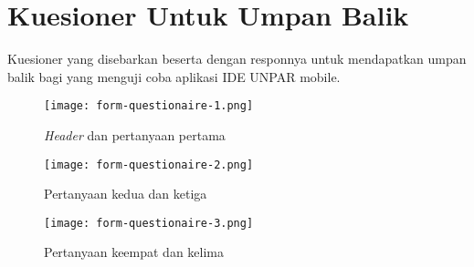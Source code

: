 \chapter{Kuesioner Untuk Umpan Balik}
\label{lamp:A}

\def\scl{1}
\def\leg{} 
\def\std{none}
\def\ymin{}
\def\ymax{}

Kuesioner yang disebarkan beserta dengan responnya untuk mendapatkan umpan balik bagi yang menguji coba aplikasi IDE UNPAR mobile.

\begin{figure}[H] 
	\centering  
	\centering
	\texttt{[image: form-questionaire-1.png]}
	\caption{\textit{Header} dan pertanyaan pertama}
	\label{fig:questionaire} 
\end{figure} 

\begin{figure}
	\centering
	\texttt{[image: form-questionaire-2.png]}
	\caption{Pertanyaan kedua dan ketiga}
\end{figure}

\begin{figure}
	\centering
	\texttt{[image: form-questionaire-3.png]}
	\caption{Pertanyaan keempat dan kelima}
\end{figure}